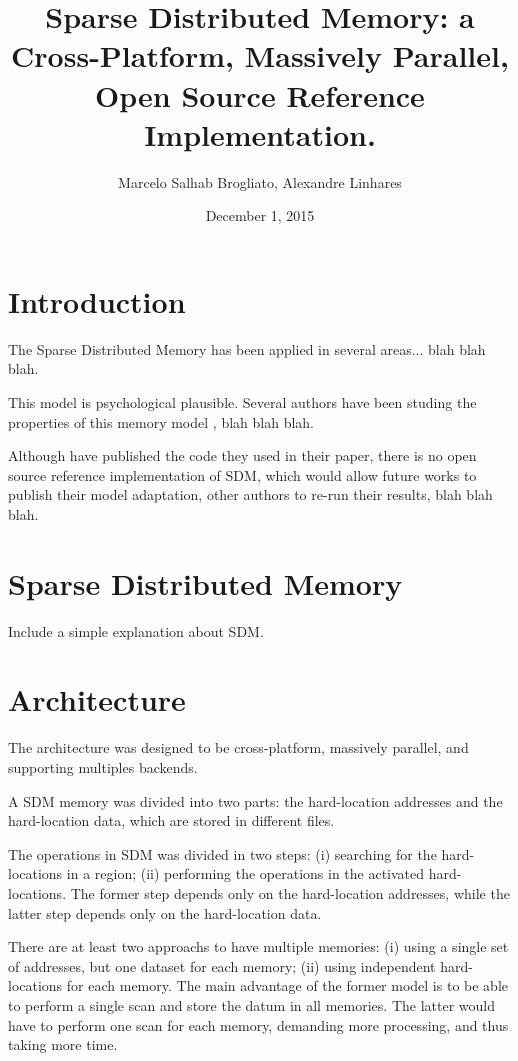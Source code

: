 \documentclass[12pt]{article}
\title{Sparse Distributed Memory: a Cross-Platform, Massively Parallel, Open Source Reference Implementation.}
\author{Marcelo Salhab Brogliato, Alexandre Linhares}
\date{December 1, 2015}
\begin{document}
\maketitle

\section{Introduction}

The Sparse Distributed Memory \citep{kanerva} has been applied in several areas... blah blah blah.

This model is psychological plausible. Several authors have been studing the properties of this memory model \citep{chada, brogliato}, blah blah blah.

Although \cite{brogliato} have published the code they used in their paper, there is no open source reference implementation of SDM, which would allow future works to publish their model adaptation, other authors to re-run their results, blah blah blah.

\section{Sparse Distributed Memory}

Include a simple explanation about SDM.


\section{Architecture}

The architecture was designed to be cross-platform, massively parallel, and supporting multiples backends.

A SDM memory was divided into two parts: the hard-location addresses and the hard-location data, which are stored in different files.

The operations in SDM was divided in two steps: (i) searching for the hard-locations in a region; (ii) performing the operations in the activated hard-locations. The former step depends only on the hard-location addresses, while the latter step depends only on the hard-location data.

There are at least two approachs to have multiple memories: (i) using a single set of addresses, but one dataset for each memory; (ii) using independent hard-locations for each memory. The main advantage of the former model is to be able to perform a single scan and store the datum in all memories. The latter would have to perform one scan for each memory, demanding more processing, and thus taking more time.
\end{document}
